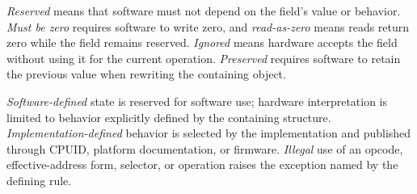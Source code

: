 \emph{Reserved} means that software must not depend on the field's value or behavior. \emph{Must be zero} requires
software to write zero, and \emph{read-as-zero} means reads return zero while the field remains reserved.
\emph{Ignored} means hardware accepts the field without using it for the current operation. \emph{Preserved}
requires software to retain the previous value when rewriting the containing object.

\emph{Software-defined} state is reserved for software use; hardware interpretation is limited to behavior
explicitly defined by the containing structure. \emph{Implementation-defined} behavior is selected by the
implementation and published through CPUID, platform documentation, or firmware. \emph{Illegal} use of an opcode,
effective-address form, selector, or operation raises the exception named by the defining rule.
